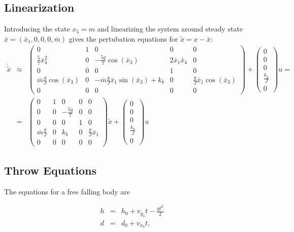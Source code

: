 \subsection{Linearization}

Introducing the state $x_{5}=m$ and linearizing the system around
steady state $\bar{x}=(\bar{x}_{1},0,0,0,\bar{m})$ gives the pertubation
equations for $\tilde{x}=x-\bar{x}$: 
\begin{eqnarray*}
\dot{\tilde{x}} & \approx & \begin{pmatrix}0 & 1 & 0 & 0 & 0\\
\frac{5}{7}\bar{x}_{4}^{2} & 0 & -\frac{5g}{7}\cos(\bar{x}_{3}) & 2\bar{x}_{1}\bar{x}_{4} & 0\\
0 & 0 & 0 & 1 & 0\\
\bar{m}\frac{g}{J}\cos(\bar{x}_{3}) & 0 & -\bar{m}\frac{g}{J}\bar{x}_{1}\sin(\bar{x}_{3})+k_{b} & 0 & \frac{g}{J}\bar{x}_{1}\cos(\bar{x}_{3})\\
0 & 0 & 0 & 0 & 0
\end{pmatrix}+\begin{pmatrix}0\\
0\\
0\\
\frac{k_{u}}{J}\\
0
\end{pmatrix}u=\\
 & = & \begin{pmatrix}0 & 1 & 0 & 0 & 0\\
0 & 0 & -\frac{5g}{7} & 0 & 0\\
0 & 0 & 0 & 1 & 0\\
\bar{m}\frac{g}{J} & 0 & k_{b} & 0 & \frac{g}{J}\bar{x}_{1}\\
0 & 0 & 0 & 0 & 0
\end{pmatrix}\tilde{x}+\begin{pmatrix}0\\
0\\
0\\
\frac{k_{u}}{J}\\
0
\end{pmatrix}u
\end{eqnarray*}



\subsection{Throw Equations}

The equations for a free falling body are

\begin{eqnarray*}
h & = & h_{0}+v_{y_{0}}t-\frac{gt^{2}}{2}\\
d & = & d_{0}+v_{x_{0}}t,
\end{eqnarray*}


